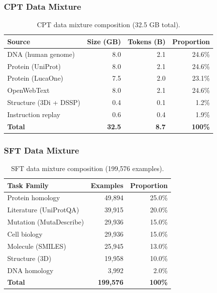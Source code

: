 \documentclass[11pt]{article}
\begin{document}
\subsubsection{CPT Data Mixture}

\begin{table}[H]
\centering
\caption{CPT data mixture composition (32.5 GB total).}
\begin{tabular}{lrrr}
\toprule
\textbf{Source} & \textbf{Size (GB)} & \textbf{Tokens (B)} & \textbf{Proportion} \\
\midrule
DNA (human genome) & 8.0 & 2.1 & 24.6\% \\
Protein (UniProt) & 8.0 & 2.1 & 24.6\% \\
Protein (LucaOne) & 7.5 & 2.0 & 23.1\% \\
OpenWebText & 8.0 & 2.1 & 24.6\% \\
Structure (3Di + DSSP) & 0.4 & 0.1 & 1.2\% \\
Instruction replay & 0.6 & 0.4 & 1.9\% \\
\midrule
\textbf{Total} & \textbf{32.5} & \textbf{8.7} & \textbf{100\%} \\
\bottomrule
\end{tabular}
\end{table}

\subsubsection{SFT Data Mixture}

\begin{table}[H]
\centering
\caption{SFT data mixture composition (199,576 examples).}
\begin{tabular}{lrr}
\toprule
\textbf{Task Family} & \textbf{Examples} & \textbf{Proportion} \\
\midrule
Protein homology & 49,894 & 25.0\% \\
Literature (UniProtQA) & 39,915 & 20.0\% \\
Mutation (MutaDescribe) & 29,936 & 15.0\% \\
Cell biology & 29,936 & 15.0\% \\
Molecule (SMILES) & 25,945 & 13.0\% \\
Structure (3D) & 19,958 & 10.0\% \\
DNA homology & 3,992 & 2.0\% \\
\midrule
\textbf{Total} & \textbf{199,576} & \textbf{100\%} \\
\bottomrule
\end{tabular}
\end{table}
\end{document}
